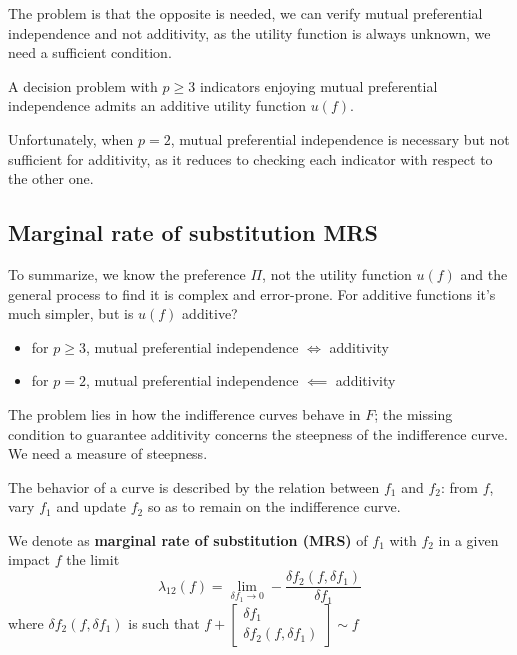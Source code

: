The problem is that the opposite is needed, we can verify mutual preferential independence and not additivity, as the utility function is always unknown, we need a sufficient condition. \\

\begin{theo}
	A decision problem with $p \geq 3$ indicators enjoying mutual preferential independence admits an additive utility function $u(f)$.
\end{theo}

Unfortunately, when $p=2$, mutual preferential independence is necessary but not sufficient for additivity, as it reduces to checking each indicator with respect to the other one.


\subsection{Marginal rate of substitution MRS}
\label{subsec:mrs}

To summarize, we know the preference $\Pi$, not the utility function $u(f)$ and the general process to find it is complex and error-prone. For additive functions it's much simpler, but is $u(f)$ additive?
\begin{itemize}
	\item for $p \geq 3$, mutual preferential independence $\Leftrightarrow$ additivity
	\item for $p = 2$, mutual preferential independence $\impliedby$ additivity
\end{itemize}

The problem lies in how the indifference curves behave in $F$; the missing condition to guarantee additivity concerns the steepness of the indifference curve. We need a measure of steepness.

The behavior of a curve is described by the relation between $f_1$ and $f_2$: from $f$, vary $f_1$ and update $f_2$ so as to remain on the indifference curve. \\

\begin{definition}
	We denote as \textbf{marginal rate of substitution (MRS)} of $f_1$ with $f_2$ in a given impact $f$ the limit 
	$$ \lambda_{12} (f) = \lim_{\delta f_1 \rightarrow 0} - \frac{\delta f_2 (f, \delta f_1)}{\delta f_1} $$
	where $\delta f_2 (f, \delta f_1)$ is such that $f + \left[\begin{array}{c}
		\delta f_1 \\ \delta f_2 (f, \delta f_1)
	\end{array}\right] \sim f$
\end{definition}

